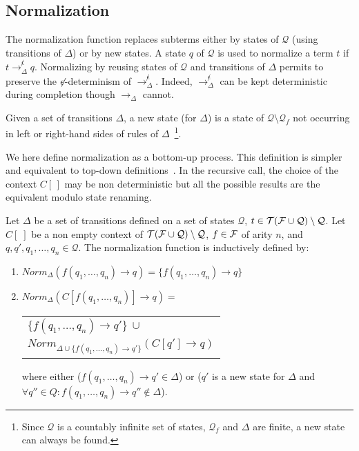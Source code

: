 \documentclass[a4paper,11pt]{llncs}
\newcommand{\Q}{\mathcal{Q}}
\def \R {\mathcal{R}}
\renewcommand{\varepsilon}{\epsilon}
\newcommand{\epsifree}{\smash{\not}\varepsilon}
\newcommand{\desc}{\R^*}
\newcommand{\F}{{\cal F}}
\newcommand{\TFQ}{{\cal T(F \cup Q)}}
\newcommand{\rw}{\rightarrow}
\newcommand{\Norm}{Norm}
\newcommand{\nr}{E}
\newcommand{\comp}{{\cal C}}
\newcommand{\rwDne}{\rightarrow^{\not\epsilon}_{\Delta}}
\newcommand{\rwD}{\rightarrow_{\Delta}}
\theoremstyle{plain}
\begin{document}
\label{sec-tac}
\renewcommand{\oldcomp}{{\cal C}_{\R,\alpha}}
\renewcommand{\nr}{\alpha}
\renewcommand{\comp}{{\cal C}_{\R,\alpha}}
\renewcommand{\desc}[1]{#1^{*}}
\renewcommand{\desc}{\R^*}
\renewcommand{\nr}{E}
\renewcommand{\comp}{{\cal C}}


\subsection{Normalization}
\label{sec-norm}
The normalization function replaces subterms either by states of $\Q$
(using transitions of $\Delta$) or by new states. A state $q$ of $\Q$ is used to
normalize a term $t$ if $t \rwDne q$. Normalizing by reusing states of
$\Q$ and transitions of $\Delta$ permits to preserve the $\epsifree$-determinism of
$\rwDne$. Indeed, $\rwDne$ can be kept deterministic during completion though
$\rwD$ cannot.

\begin{definition}
  Given a set of transitions $\Delta$, a new state (for $\Delta$) is a state 
of $\Q\setminus\Q_f$ not occurring in left or right-hand sides of rules of
  $\Delta$~\footnote{Since $\Q$ is a countably infinite set of 
states, $\Q_f$ and $\Delta$ are finite, a new state can always be found.}.
\end{definition}

\noindent
We here define normalization as a bottom-up process. This definition is simpler and
equivalent to top-down definitions~\cite{GenetR-JSC10}. In the recursive call,
the choice of the context $C[\,]$ may be non deterministic but all the
possible results are the equivalent modulo state renaming. 

\begin{definition}[Normalization]
\label{def:normalization}
Let $\Delta$ be a set of transitions defined on a set of states $\Q$, $t \in
\TFQ \setminus \Q$. Let $C[\;]$ be a non empty context of
$\TFQ\setminus \Q$, $f\in \F$ of arity 
$n$, and $q,q',q_1, \ldots, q_n\in\Q$. The normalization function is inductively
defined by:
\begin{enumerate}
\item $\Norm_{\Delta}(f(q_1, \ldots, q_n) \rw q) = \{ f(q_1, \ldots, q_n) \rw
  q\}$

\item $\Norm_{\Delta}(C[f(q_1, \ldots, q_n)] \rw q) =$ 
\begin{tabular}[t]{l}
    $ \{ f(q_1, \ldots, q_n) \rw q'\} \: \cup$ \\
    $\Norm_{\Delta\cup\{f(q_1, \ldots, q_n) \rw  q'\}} (C[q'] \rw q)$
\end{tabular} 

where either ($f(q_1, \ldots, q_n) \rw q' \in \Delta$) or ($q'$ is a new state for
$\Delta$ and
$\forall q'' \in Q : f(q_1, \ldots, q_n) \rw q'' \not \in \Delta$).
\end{enumerate} 
\end{definition}
\end{document}
